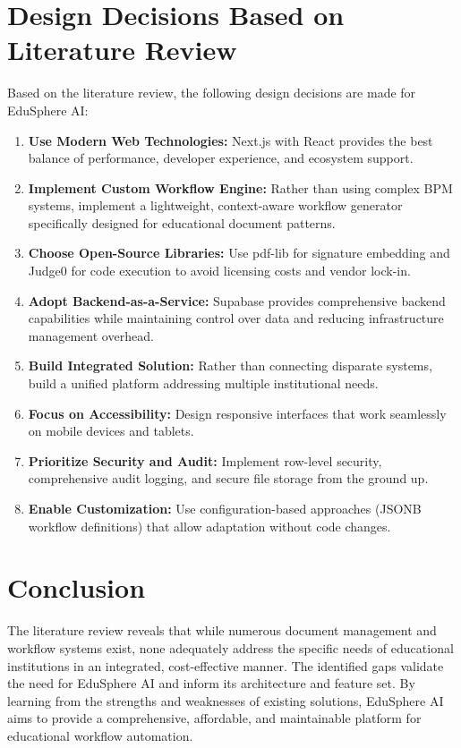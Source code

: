 \section{Design Decisions Based on Literature Review}

Based on the literature review, the following design decisions are made for EduSphere AI:

\begin{enumerate}
\item \textbf{Use Modern Web Technologies:} Next.js with React provides the best balance of performance, developer experience, and ecosystem support.

\item \textbf{Implement Custom Workflow Engine:} Rather than using complex BPM systems, implement a lightweight, context-aware workflow generator specifically designed for educational document patterns.

\item \textbf{Choose Open-Source Libraries:} Use pdf-lib for signature embedding and Judge0 for code execution to avoid licensing costs and vendor lock-in.

\item \textbf{Adopt Backend-as-a-Service:} Supabase provides comprehensive backend capabilities while maintaining control over data and reducing infrastructure management overhead.

\item \textbf{Build Integrated Solution:} Rather than connecting disparate systems, build a unified platform addressing multiple institutional needs.

\item \textbf{Focus on Accessibility:} Design responsive interfaces that work seamlessly on mobile devices and tablets.

\item \textbf{Prioritize Security and Audit:} Implement row-level security, comprehensive audit logging, and secure file storage from the ground up.

\item \textbf{Enable Customization:} Use configuration-based approaches (JSONB workflow definitions) that allow adaptation without code changes.
\end{enumerate}

\section{Conclusion}

The literature review reveals that while numerous document management and workflow systems exist, none adequately address the specific needs of educational institutions in an integrated, cost-effective manner. The identified gaps validate the need for EduSphere AI and inform its architecture and feature set. By learning from the strengths and weaknesses of existing solutions, EduSphere AI aims to provide a comprehensive, affordable, and maintainable platform for educational workflow automation.

\newpage
